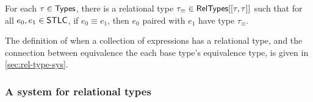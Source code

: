 
%
For each $\tau \in \mathsf{Types}$, there is a relational type $\tau_{\equiv}
\in \mathsf{RelTypes}[  [ \tau, \tau]  ]$ such that for all $e_0, e_1 \in
\mathsf{STLC}$, if $e_0 \equiv e_1$, then $e_0$ paired with $e_1$ have type
$\tau_{\equiv}$.
%

% 
The definition of when a collection of expressions has a relational
type, and the connection between equivalence the each base type's
equivalence type, is given in \autoref{sec:rel-type-sys}.


\subsubsection{A system for relational types}
\label{sec:rel-type-sys}

